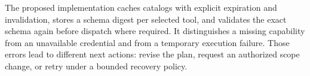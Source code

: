 The proposed implementation caches catalogs with explicit expiration and invalidation, stores a schema digest per selected tool, and validates the exact schema again before dispatch where required. It distinguishes a missing capability from an unavailable credential and from a temporary execution failure. Those errors lead to different next actions: revise the plan, request an authorized scope change, or retry under a bounded recovery policy.

